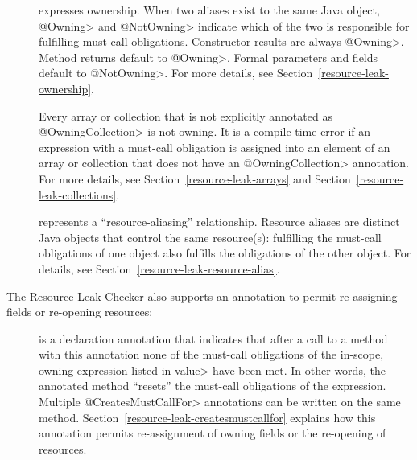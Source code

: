 \begin{description}

\item[]
\item[]
  expresses ownership.  When two aliases exist to the same Java object,
  \<@Owning> and \<@NotOwning> indicate which of the two is responsible for
  fulfilling must-call obligations.
  Constructor results are always \<@Owning>. Method returns default to
  \<@Owning>.  Formal parameters and fields default to \<@NotOwning>.
  For more details, see Section~\ref{resource-leak-ownership}.
\item[]
  Every array or collection that is not explicitly annotated as \<@OwningCollection> is not owning. It is a compile-time error if an expression with a must-call obligation is assigned into an element of an array or collection that does not have an \<@OwningCollection> annotation. For more details, see Section~\ref{resource-leak-arrays} and Section~\ref{resource-leak-collections}.

\item[]
  represents a ``resource-aliasing'' relationship.  Resource aliases are
  distinct Java objects that control the same resource(s):
  fulfilling the must-call obligations of one object also
  fulfills the obligations of the other object.  For details,
  see Section~\ref{resource-leak-resource-alias}.

\end{description}

The Resource Leak Checker also supports an annotation to permit re-assigning
fields or re-opening resources:

\begin{description}

\item[]
  is a declaration annotation that indicates that after a call to a method
  with this annotation none of the must-call obligations of the in-scope, owning expression
  listed in \<value> have been met.
  In other words, the annotated method ``resets'' the must-call obligations of the expression.
  Multiple \<@CreatesMustCallFor>
  annotations can be written on the same method.  Section~\ref{resource-leak-createsmustcallfor}
  explains how this annotation permits re-assignment of owning
  fields or the re-opening of resources.

\end{description}


